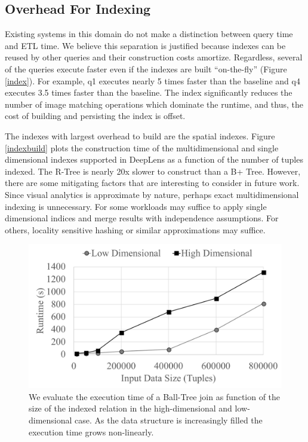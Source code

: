 \subsection{Overhead For Indexing}
Existing systems in this domain do not make a distinction between query time and ETL time.
We believe this separation is justified because indexes can be reused by other queries and their construction costs amortize.
Regardless, several of the queries execute faster even if the indexes are built ``on-the-fly'' (Figure \ref{index}).
For example, q1 executes nearly 5 times faster than the baseline and q4 executes 3.5 times faster than the baseline.
The index significantly reduces the number of image matching operations which dominate the runtime, and thus, the cost of building and persisting the index is offset.

The indexes with largest overhead to build are the spatial indexes.
Figure \ref{indexbuild} plots the construction time of the multidimensional and single dimensional indexes supported in \textsf{DeepLens} as a function of the number of tuples indexed.
The R-Tree is nearly 20x slower to construct than a B+ Tree.
However, there are some mitigating factors that are interesting to consider in future work.
Since visual analytics is approximate by nature, perhaps exact multidimensional indexing is unnecessary. 
For some workloads may suffice to apply single dimensional indices and merge results with independence assumptions.
For others, locality sensitive hashing or similar approximations may suffice.

\begin{figure}[t]
\centering
 \includegraphics[width=\columnwidth]{figures/spatialjoin.png}
 \caption{We evaluate the execution time of a Ball-Tree join as function of the size of the indexed relation in the high-dimensional and low-dimensional case. As the data structure is increasingly filled the execution time grows non-linearly.  \label{join} }
\end{figure}


